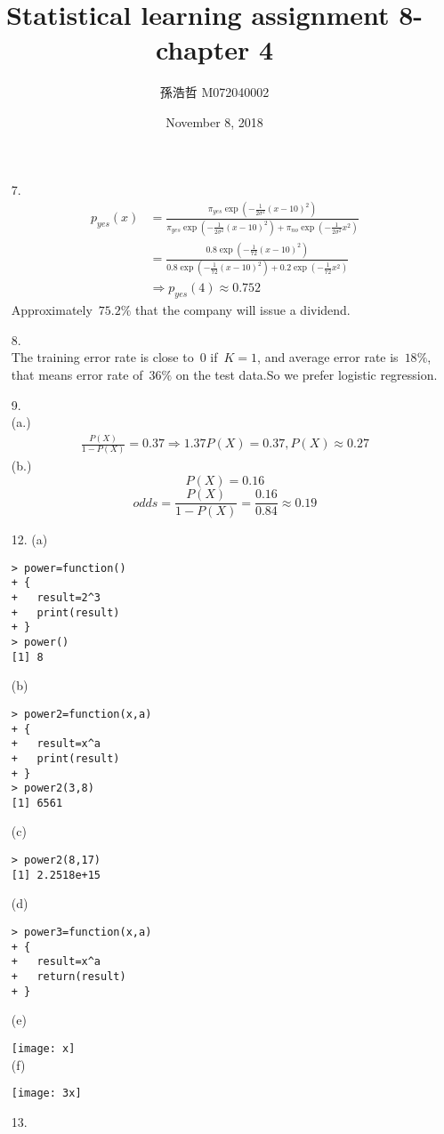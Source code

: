 \documentclass[12pt]{article}
\title{Statistical learning assignment 8- chapter 4}
\author{孫浩哲 \hspace{0.7cm} M072040002}
\date{November 8, 2018}
\begin{document}
\maketitle
\begin{itemize}
\item[7.]
\begin{align*}
p_{yes}(x)
&=\frac{\pi_{yes}\exp({-\frac{1}{2\sigma^2}}(x-10)^2)}{\pi_{yes}\exp({-\frac{1}{2\sigma^2}}(x-10)^2)+\pi_{no}\exp({-\frac{1}{2\sigma^2}}x^2)}\\
&=\frac{0.8\exp({-\frac{1}{72}}(x-10)^2)}{0.8\exp({-\frac{1}{72}}(x-10)^2)+0.2\exp({-\frac{1}{72}}x^2)}\\[4ex]
&\Rightarrow p_{yes}(4)\approx0.752
\end{align*}
Approximately\ $75.2\%$ that the company will issue a dividend.
\item[8.]
\ \\
The training error rate is close to\ $0$ if\ $K=1$, and average error rate is\ $18\%$, that means error rate of\ $36\%$ on the test data.So we prefer logistic regression.
\item[9.]
\ \\
(a.)
\begin{align*}
\frac{P(X)}{1-P(X)}=0.37\Rightarrow1.37P(X)=0.37,P(X)\approx0.27
\end{align*}
(b.)\\
$$P(X)=0.16$$
$$odds=\frac{P(X)}{1-P(X)}=\frac{0.16}{0.84}\approx0.19$$
\newpage
\item[12.]
(a)
\begin{verbatim}
> power=function()
+ {
+   result=2^3
+   print(result)
+ }
> power()
[1] 8
\end{verbatim}
(b)
\begin{verbatim}
> power2=function(x,a)
+ {
+   result=x^a
+   print(result)
+ }
> power2(3,8)
[1] 6561
\end{verbatim}
(c)
\begin{verbatim}
> power2(8,17)
[1] 2.2518e+15
\end{verbatim}
(d)
\begin{verbatim}
> power3=function(x,a)
+ {
+   result=x^a
+   return(result)
+ }
\end{verbatim}
\newpage
(e)\ \\
\raggedright{\texttt{[image: x]}}\\
(f)\ \\
\raggedright{\texttt{[image: 3x]}}
\item[13.]
\begin{verbatim}

\end{verbatim}
\end{itemize}
\end{document}
